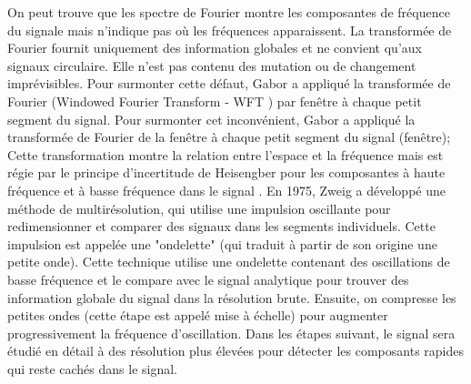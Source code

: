 On peut trouve que les spectre de Fourier montre les composantes de fréquence du signale mais n'indique pas où les fréquences apparaissent. La transformée de Fourier fournit uniquement des information globales et ne convient qu'aux signaux circulaire. Elle n'est pas contenu des mutation ou de changement imprévisibles. Pour surmonter cette défaut, Gabor \cite{gabor1946} a appliqué la transformée de Fourier (Windowed Fourier Transform - WFT ) par fenêtre à chaque petit segment du signal. Pour surmonter cet inconvénient, Gabor a appliqué la transformée de Fourier de la fenêtre à chaque petit segment du signal (fenêtre); Cette transformation montre la relation entre l'espace et la fréquence mais est régie par le principe d'incertitude de Heisengber pour les composantes à haute fréquence et à basse fréquence dans le signal \cite{kaiser1994}. En 1975, Zweig a développé une méthode de multirésolution, qui utilise une impulsion oscillante pour redimensionner et comparer des signaux dans les segments individuels. Cette impulsion est appelée une "ondelette" (qui traduit à partir de son origine une petite onde). Cette technique utilise une ondelette contenant des oscillations de basse fréquence et le compare avec le signal analytique pour trouver des information globale du signal dans la résolution brute. Ensuite, on compresse les petites ondes (cette étape est appelé mise à échelle) pour augmenter progressivement la fréquence d'oscillation. Dans les étapes suivant, le signal sera étudié en détail à des résolution plus élevées pour détecter les composants rapides qui reste cachés dans le signal.

